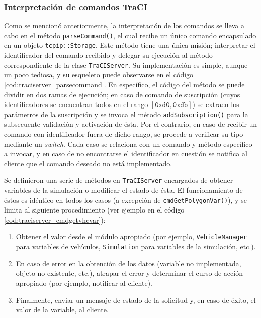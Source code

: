 



\subsubsection{Interpretación de comandos TraCI}

Como se mencionó anteriormente, la interpretación de los comandos se lleva a cabo en el método \texttt{parseCommand()}, el cual recibe un único comando encapsulado en un objeto \texttt{tcpip::Storage}. Este método tiene una única misión; interpretar el identificador del comando recibido y delegar su ejecución al método correspondiente de la clase \texttt{TraCIServer}. Su implementación es simple, aunque un poco tediosa, y su esqueleto puede observarse en el código \ref{cod:traciserver_parsecommand}. En específico, el código del método se puede dividir en dos ramas de ejecución; en caso de comando de suscripción (cuyos identificadores se encuentran todos en el rango $[\texttt{0xd0}, \texttt{0xdb}]$) se extraen los parámetros de la suscripción y se invoca el método \texttt{addSubscription()} para la subsecuente validación y activación de ésta. Por el contrario, en caso de recibir un comando con identificador fuera de dicho rango, se procede a verificar su tipo mediante un \emph{switch}. Cada caso se relaciona con un comando y método específico a invocar, y en caso de no encontrarse el identificador en cuestión se notifica al cliente que el comando deseado no está implementado.



Se definieron una serie de métodos en \texttt{TraCIServer} encargados de obtener variables de la simulación o modificar el estado de ésta. El funcionamiento de éstos es idéntico en todos los casos (a excepción de \texttt{cmdGetPolygonVar()}), y se limita al siguiente procedimiento (ver ejemplo en el código \ref{cod:traciserver_cmdgetvhcvar}):

\begin{enumerate}
    \item Obtener el valor desde el módulo apropiado (por ejemplo, \texttt{VehicleManager} para variables de vehículos, \texttt{Simulation} para variables de la simulación, etc.).
    \item En caso de error en la obtención de los datos (variable no implementada, objeto no existente, etc.), atrapar el error y determinar el curso de acción apropiado (por ejemplo, notificar al cliente).
    \item Finalmente, enviar un mensaje de estado de la solicitud y, en caso de éxito, el valor de la variable, al cliente.
\end{enumerate}

